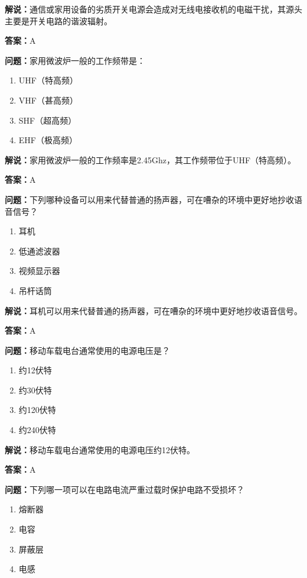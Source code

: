 \documentclass[UTF8]{ctexbook}
\begin{document}
\textbf{解说：}通信或家用设备的劣质开关电源会造成对无线电接收机的电磁干扰，其源头主要是开关电路的谐波辐射。%

\textbf{答案：}A

\textbf{问题：}家用微波炉一般的工作频带是：

\begin{enumerate}[label=\Alph*), leftmargin=3em]
  \item UHF（特高频）
  \item VHF（甚高频）
  \item SHF（超高频）
  \item EHF（极高频）
\end{enumerate}

\textbf{解说：}家用微波炉一般的工作频率是2.45Ghz，其工作频带位于UHF（特高频）。%

\textbf{答案：}A

\textbf{问题：}下列哪种设备可以用来代替普通的扬声器，可在嘈杂的环境中更好地抄收语音信号？

\begin{enumerate}[label=\Alph*), leftmargin=3em]
  \item 耳机
  \item 低通滤波器
  \item 视频显示器
  \item 吊杆话筒
\end{enumerate}

\textbf{解说：}耳机可以用来代替普通的扬声器，可在嘈杂的环境中更好地抄收语音信号。%

\textbf{答案：}A

\textbf{问题：}移动车载电台通常使用的电源电压是？

\begin{enumerate}[label=\Alph*), leftmargin=3em]
  \item 约12伏特
  \item 约30伏特
  \item 约120伏特
  \item 约240伏特
\end{enumerate}

\textbf{解说：}移动车载电台通常使用的电源电压约12伏特。%

\textbf{答案：}A

\textbf{问题：}下列哪一项可以在电路电流严重过载时保护电路不受损坏？

\begin{enumerate}[label=\Alph*), leftmargin=3em]
  \item 熔断器
  \item 电容
  \item 屏蔽层
  \item 电感
\end{enumerate}
\end{document}
